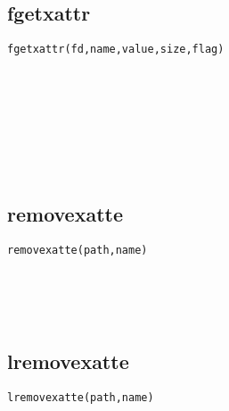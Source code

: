 \documentclass[10pt,a4paper]{article}
\begin{document}
\subsection{fgetxattr}
\begin{spacing}{2.0}
\lstset{language=C,numbers=none}
\begin{lstlisting}
fgetxattr(fd,name,value,size,flag)
\end{lstlisting}
{\large\color[rgb]{0.2,0.4,0.6}{fd:}} \\
{\large\color[rgb]{0.2,0.4,0.6}{name:}} \\
{\large\color[rgb]{0.2,0.4,0.6}{value:}} \\
{\large\color[rgb]{0.2,0.4,0.6}{size:}} \\
{\large\color[rgb]{0.2,0.4,0.6}{flag:}}
\paragraph{ \ \ }
\end{spacing}

\subsection{removexatte}
\begin{spacing}{2.0}
\lstset{language=C,numbers=none}
\begin{lstlisting}
removexatte(path,name)
\end{lstlisting}
{\large\color[rgb]{0.2,0.4,0.6}{path:}} \\
{\large\color[rgb]{0.2,0.4,0.6}{name:}}
\paragraph{ \ \ }
\end{spacing}

\subsection{lremovexatte}
\begin{spacing}{2.0}
\lstset{language=C,numbers=none}
\begin{lstlisting}
lremovexatte(path,name)
\end{lstlisting}
{\large\color[rgb]{0.2,0.4,0.6}{path:}} \\
{\large\color[rgb]{0.2,0.4,0.6}{name:}}
\paragraph{ \ \ }
\end{spacing}
\end{document}
